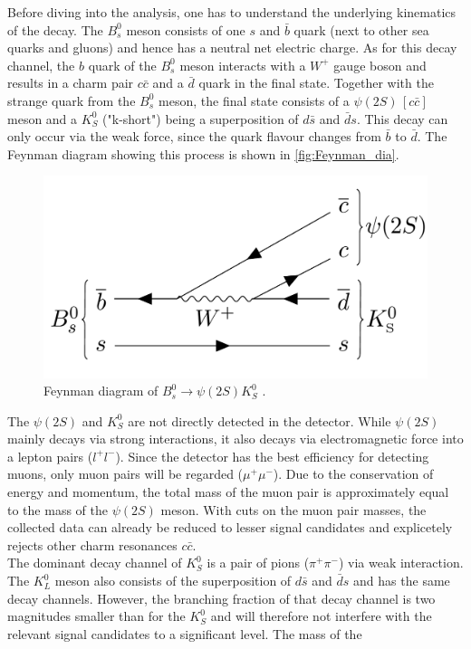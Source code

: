 Before diving into the analysis, one has to understand the underlying kinematics of the decay. The $B_s^0$ meson consists of one $s$ and $\bar{b}$ quark (next to other sea quarks and gluons) and hence
has a neutral net electric charge. As for this decay channel, the $b$ quark of the $B_s^0$ meson interacts with a $W^+$ gauge boson and results in a charm pair $c \bar{c}$ and a $\bar{d}$ quark in the 
final state. Together with the strange quark from the $B_s^0$ meson, the final state consists of a $\psi (2S) \, [c \bar{c}]$ meson and a $K_S^0$ ("k-short") being a superposition of $d\bar{s}$ and $\bar{d}s$.
This decay can only occur via the weak force, since the quark flavour changes from $\bar{b}$ to $\bar{d}$. The Feynman diagram showing this process is shown in \autoref{fig:Feynman_dia}.\\
\begin{figure}
    \centering
    \includegraphics[width = .8\textwidth]{"content/pics/Feynman.png"}
    \caption{Feynman diagram of $B_s^0 \to \psi (2S)K_S^0$ \cite{LHCb_MVA}.}
    \label{fig:Feynman_dia}
  \end{figure}
The $\psi (2S)$ and $K_S^0$ are not directly detected in the detector. While $\psi (2S)$ mainly decays via strong interactions, it also decays via
electromagnetic force into a lepton pairs ($l^+l^-$).
Since the detector has the best efficiency for detecting muons, only muon pairs will be regarded ($\mu^+\mu^-$). Due to the conservation of energy and momentum, the 
total mass of the muon pair is approximately equal to the mass of the $\psi (2S)$ meson. With cuts on the muon pair masses, the collected data can already be reduced to lesser signal candidates and explicetely
rejects other charm resonances $c\bar{c}$.\\
The dominant decay channel of $K_S^0$ is a pair of pions ($\pi^+\pi^-$) via weak interaction. The $K_L^0$ meson also consists of the superposition of $d\bar{s}$ and $\bar{d}s$ and has the same decay channels.
However, the branching fraction of that decay channel is two magnitudes smaller than for the $K_S^0$ and will therefore not interfere with the relevant signal candidates to a significant level. The mass of the
